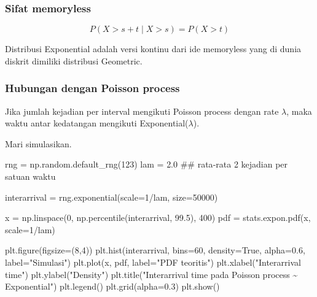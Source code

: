 \documentclass[
  letterpaper,
  DIV=11,
  numbers=noendperiod]{scrreprt}
\newenvironment{Shaded}{\begin{snugshade}}{\end{snugshade}}
\newcommand{\CommentTok}[1]{\textcolor[rgb]{0.37,0.37,0.37}{#1}}
\newcommand{\DecValTok}[1]{\textcolor[rgb]{0.68,0.00,0.00}{#1}}
\newcommand{\FloatTok}[1]{\textcolor[rgb]{0.68,0.00,0.00}{#1}}
\newcommand{\NormalTok}[1]{\textcolor[rgb]{0.00,0.23,0.31}{#1}}
\newcommand{\OperatorTok}[1]{\textcolor[rgb]{0.37,0.37,0.37}{#1}}
\newcommand{\StringTok}[1]{\textcolor[rgb]{0.13,0.47,0.30}{#1}}
\newcommand{\VariableTok}[1]{\textcolor[rgb]{0.07,0.07,0.07}{#1}}
\begin{document}
\subsubsection{Sifat memoryless}\label{sifat-memoryless-1}

\[
P(X>s+t \mid X>s)=P(X>t)
\]

Distribusi Exponential adalah versi kontinu dari ide memoryless yang di
dunia diskrit dimiliki distribusi Geometric.

\subsubsection{Hubungan dengan Poisson
process}\label{hubungan-dengan-poisson-process}

Jika jumlah kejadian per interval mengikuti Poisson process dengan rate
\(\lambda\), maka waktu antar kedatangan mengikuti
Exponential(\(\lambda\)).

Mari simulasikan.

\begin{Shaded}
\begin{Highlighting}[]
\NormalTok{rng }\OperatorTok{=}\NormalTok{ np.random.default\_rng(}\DecValTok{123}\NormalTok{)}
\NormalTok{lam }\OperatorTok{=} \FloatTok{2.0}  \CommentTok{\#\# rata{-}rata 2 kejadian per satuan waktu}

\NormalTok{interarrival }\OperatorTok{=}\NormalTok{ rng.exponential(scale}\OperatorTok{=}\DecValTok{1}\OperatorTok{/}\NormalTok{lam, size}\OperatorTok{=}\DecValTok{50000}\NormalTok{)}

\NormalTok{x }\OperatorTok{=}\NormalTok{ np.linspace(}\DecValTok{0}\NormalTok{, np.percentile(interarrival, }\FloatTok{99.5}\NormalTok{), }\DecValTok{400}\NormalTok{)}
\NormalTok{pdf }\OperatorTok{=}\NormalTok{ stats.expon.pdf(x, scale}\OperatorTok{=}\DecValTok{1}\OperatorTok{/}\NormalTok{lam)}

\NormalTok{plt.figure(figsize}\OperatorTok{=}\NormalTok{(}\DecValTok{8}\NormalTok{,}\DecValTok{4}\NormalTok{))}
\NormalTok{plt.hist(interarrival, bins}\OperatorTok{=}\DecValTok{60}\NormalTok{, density}\OperatorTok{=}\VariableTok{True}\NormalTok{, alpha}\OperatorTok{=}\FloatTok{0.6}\NormalTok{, label}\OperatorTok{=}\StringTok{"Simulasi"}\NormalTok{)}
\NormalTok{plt.plot(x, pdf, label}\OperatorTok{=}\StringTok{"PDF teoritis"}\NormalTok{)}
\NormalTok{plt.xlabel(}\StringTok{"Interarrival time"}\NormalTok{)}
\NormalTok{plt.ylabel(}\StringTok{"Density"}\NormalTok{)}
\NormalTok{plt.title(}\StringTok{"Interarrival time pada Poisson process \textasciitilde{} Exponential"}\NormalTok{)}
\NormalTok{plt.legend()}
\NormalTok{plt.grid(alpha}\OperatorTok{=}\FloatTok{0.3}\NormalTok{)}
\NormalTok{plt.show()}
\end{Highlighting}
\end{Shaded}
\end{document}

